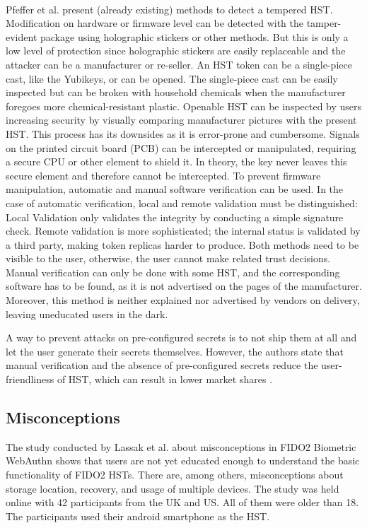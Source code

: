 \documentclass[runningheads]{llncs}
\begin{document}
\paragraph{}
Pfeffer et al. present (already existing) methods to detect a tempered HST.
Modification on hardware or firmware level can be detected with the tamper-evident package using holographic stickers or other methods. But this is only a low level of protection since holographic stickers are easily replaceable and the attacker can be a manufacturer or re-seller. An HST token can be a single-piece cast, like the Yubikeys, or can be opened. The single-piece cast can be easily inspected but can be broken with household chemicals when the manufacturer foregoes more chemical-resistant plastic. Openable HST can be inspected by users increasing security by visually comparing manufacturer pictures with the present HST. This process has its downsides as it is error-prone and cumbersome. Signals on the printed circuit board (PCB) can be intercepted or manipulated, requiring a secure CPU or other element to shield it. In theory, the key never leaves this secure element and therefore cannot be intercepted. To prevent firmware manipulation, automatic and manual software verification can be used. In the case of automatic verification, local and remote validation must be distinguished: Local Validation only validates the integrity by conducting a simple signature check. Remote validation is more sophisticated; the internal status is validated by a third party, making token replicas harder to produce. Both methods need to be visible to the user, otherwise, the user cannot make related trust decisions.
Manual verification can only be done with some HST, and the corresponding software has to be found, as it is not advertised on the pages of the manufacturer. Moreover, this method is neither explained nor advertised by vendors on delivery, leaving uneducated users in the dark. 

A way to prevent attacks on pre-configured secrets is to not ship them at all and let the user generate their secrets themselves. However, the authors state that manual verification and the absence of pre-configured secrets reduce the user-friendliness of HST, which can result in lower market shares \cite{272198}.

\subsection{Misconceptions}
The study conducted by Lassak et al. \cite{274547} about misconceptions in FIDO2 Biometric WebAuthn shows that users are not yet educated enough to understand the basic functionality of FIDO2 HSTs. There are, among others, misconceptions about storage location, recovery, and usage of multiple devices. The study was held online with 42 participants from the UK and US. All of them were older than 18. The participants used their android smartphone as the HST.
\end{document}
